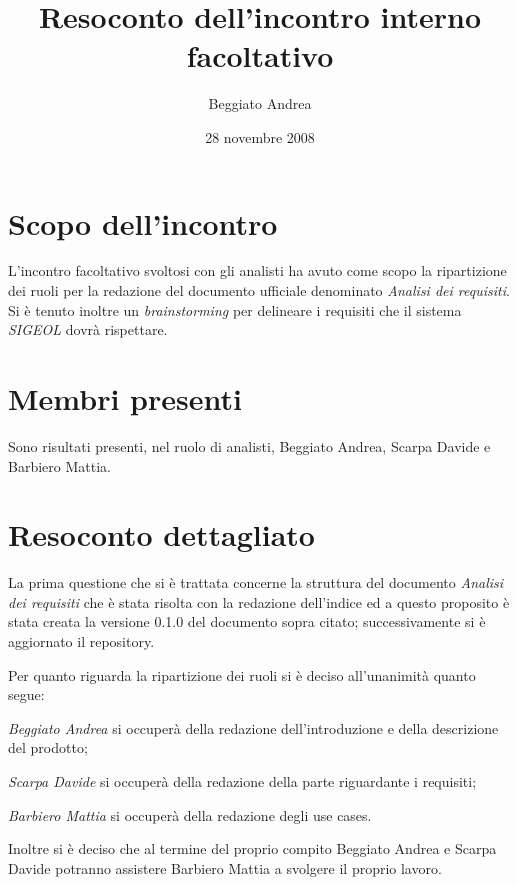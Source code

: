 \documentclass[11pt,a4paper]{article}
\title{Resoconto dell'incontro interno facoltativo}
\author{Beggiato Andrea}
\date{28 novembre 2008}
\begin{document}
\maketitle
\section{Scopo dell'incontro}
L'incontro facoltativo svoltosi con gli analisti ha avuto come scopo la ripartizione dei ruoli per la redazione del documento ufficiale denominato \textit{Analisi dei requisiti}. Si è tenuto inoltre un \textit{brainstorming} per delineare i requisiti che il sistema \textit{SIGEOL} dovrà rispettare.
\section{Membri presenti}
Sono risultati presenti, nel ruolo di analisti, Beggiato Andrea, Scarpa Davide e Barbiero Mattia.
\section{Resoconto dettagliato}
La prima questione che si è trattata concerne la struttura del documento \textit{Analisi dei requisiti} che è stata risolta con la redazione dell'indice ed a questo proposito è stata creata la versione 0.1.0 del documento sopra citato; successivamente si è aggiornato il repository.

Per quanto riguarda la ripartizione dei ruoli si è deciso all'unanimità quanto segue:
\begin{description}
 \item \textit{Beggiato Andrea} si occuperà della redazione dell'introduzione e della descrizione del prodotto;
 \item \textit{Scarpa Davide} si occuperà della redazione della parte riguardante i requisiti;
 \item \textit{Barbiero Mattia} si occuperà della redazione degli use cases.
 \end{description}
Inoltre si è deciso che al termine del proprio compito Beggiato Andrea e Scarpa Davide potranno assistere Barbiero Mattia a svolgere il proprio lavoro.
\end{document}
